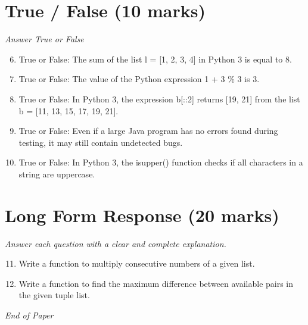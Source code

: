 \documentclass[12pt]{article}
\begin{document}
\section*{True / False (10 marks)}
\textit{Answer True or False}
\begin{enumerate}[label=\arabic*.]
\setcounter{enumi}{5}
\item True or False: The sum of the list l = [1, 2, 3, 4] in Python 3 is equal to 8.
\item True or False: The value of the Python expression 1 + 3 \% 3 is 3.
\item True or False: In Python 3, the expression b[::2] returns [19, 21] from the list b = [11, 13, 15, 17, 19, 21].
\item True or False: Even if a large Java program has no errors found during testing, it may still contain undetected bugs.
\item True or False: In Python 3, the isupper() function checks if all characters in a string are uppercase.
\end{enumerate}

\section*{Long Form Response (20 marks)}
\textit{Answer each question with a clear and complete explanation.}
\begin{enumerate}[label=\arabic*.]
\setcounter{enumi}{10}
\item Write a function to multiply consecutive numbers of a given list.
\item Write a function to find the maximum difference between available pairs in the given tuple list.
\end{enumerate}

\vfill
\noindent\textit{End of Paper}
\end{document}
